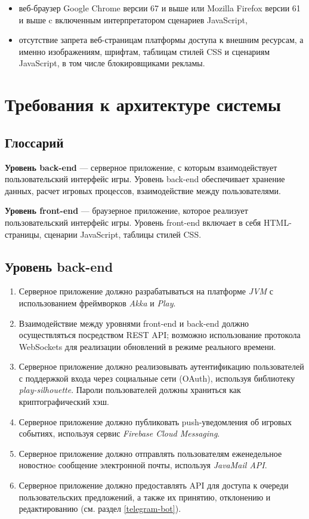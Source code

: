 \documentclass[12pt, a4paper]{article}
\begin{document}
\begin{itemize}
\item веб-браузер Google Chrome версии 67 и выше или
Mozilla Firefox версии 61 и выше c включенным интерпретатором сценариев JavaScript,
\item отсутствие запрета веб-страницам платформы доступа к внешним ресурсам,
а именно изображениям, шрифтам, таблицам стилей CSS и сценариям JavaScript,
в том числе блокировщиками рекламы.
\end{itemize}

\section{Требования к архитектуре системы}

\subsection{Глоссарий}

\textbf{Уровень back-end} — серверное приложение, с которым взаимодействует
пользовательский интерфейс игры. Уровень back-end обеспечивает хранение данных,
расчет игровых процессов, взаимодействие между пользователями.

\textbf{Уровень front-end} — браузерное приложение, которое реализует
пользовательский интерфейс игры. Уровень front-end включает в себя
HTML-страницы, сценарии JavaScript, таблицы стилей CSS.

\subsection{Уровень back-end}

\begin{enumerate}
\item Серверное приложение должно разрабатываться на платформе \textit{JVM}
с использованием фреймворков \textit{Akka} и \textit{Play}.
\item Взаимодействие между уровнями front-end и back-end должно осуществляться
посредством REST API; возможно использование протокола WebSockets для реализации
обновлений в режиме реального времени.
\item Серверное приложение должно реализовывать аутентификацию пользователей
с поддержкой входа через социальные сети (OAuth), используя библиотеку
\textit{play-silhouette}. Пароли пользователей должны храниться как
криптографический хэш.
\item Серверное приложение должно публиковать push-уведомления об игровых событиях,
используя сервис \textit{Firebase Cloud Messaging}.
\item Серверное приложение должно отправлять пользователям еженедельное новостноe
сообщение электронной почты, используя \textit{JavaMail API}.
\item Серверное приложение должно предоставлять API для доступа к очереди
пользовательских предложений, а также их принятию, отклонению и редактированию
(см. раздел \ref{telegram-bot}).
\end{enumerate}
\end{document}
